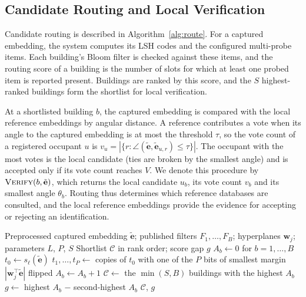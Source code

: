 \documentclass[pdflatex,sn-mathphys-num]{sn-jnl}%
\theoremstyle{thmstyleone}%
\theoremstyle{thmstyletwo}%
\theoremstyle{thmstylethree}%
\begin{document}
\subsection{Candidate Routing and Local Verification}
\label{subsec:routing_verification}

Candidate routing is described in Algorithm~\ref{alg:route}. For a captured embedding, the system computes its LSH codes and the configured multi-probe items. Each building's Bloom filter is checked against these items, and the routing score of a building is the number of slots for which at least one probed item is reported present. Buildings are ranked by this score, and the $S$ highest-ranked buildings form the shortlist for local verification.

At a shortlisted building $b$, the captured embedding is compared with the local reference embeddings by angular distance. A reference contributes a vote when its angle to the captured embedding is at most the threshold $\tau$, so the vote count of a registered occupant $u$ is $v_u=|\{r:\angle(\tilde{\mathbf{e}},\tilde{\mathbf{e}}_{u,r})\leq\tau\}|$. The occupant with the most votes is the local candidate (ties are broken by the smallest angle) and is accepted only if its vote count reaches $V$. We denote this procedure by $\textsc{Verify}(b,\tilde{\mathbf{e}})$, which returns the local candidate $u_b$, its vote count $v_b$ and its smallest angle $\theta_b$. Routing thus determines which reference databases are consulted, and the local reference embeddings provide the evidence for accepting or rejecting an identification.

\begin{algorithm}[!t]
\footnotesize
\caption{Candidate routing (\textsc{Route})}
\label{alg:route}
\begin{algorithmic}[1]
\Require Preprocessed captured embedding $\tilde{\mathbf{e}}$; published filters $F_1,\dots,F_B$; hyperplanes $\mathbf{w}_j$; parameters $L$, $P$, $S$
\Ensure Shortlist $\mathcal{C}$ in rank order; score gap $g$
\State $A_b\gets0$ for $b=1,\dots,B$ 
  \State $t_0\gets s_\ell(\tilde{\mathbf{e}})$ 
  \State $t_1,\dots,t_P\gets$ copies of $t_0$ with one of the $P$ bits of smallest margin $|\mathbf{w}_j^\top\tilde{\mathbf{e}}|$ flipped 
      \State $A_b\gets A_b+1$ 
    \EndIf
  \EndFor
\EndFor
\State $\mathcal{C}\gets$ the $\min(S,B)$ buildings with the highest $A_b$ 
\State $g\gets$ highest $A_b$ $-$ second-highest $A_b$ 
\State \Return $\mathcal{C}$, $g$
\end{algorithmic}
\end{algorithm}
\end{document}
